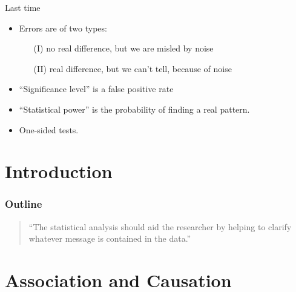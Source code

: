 
\subtitle{and statistical significance}

\date{10 March 2013}




\begin{frame}
  \maketitle
\end{frame}

\begin{frame}{Last time}

    \begin{itemize}
        \item Errors are of two types: 
            \begin{itemize}
                \item[(I)] \alert{no} real difference, but we are misled by noise
                \item[(II)] \alert{real} difference, but we can't tell, because of noise
            \end{itemize}
        \item ``Significance level'' is a false positive rate 
        \item ``Statistical power'' is the probability of finding a real pattern.
        \item One-sided tests.
    \end{itemize}

\end{frame}

\section*{Introduction}
\begin{frame}\frametitle<presentation>{Outline}
  \begin{quote}
    ``The statistical analysis should aid the researcher by helping to clarify whatever
    message is contained in the data.''
  \end{quote}
  \tableofcontents
\end{frame}


\section{Association and Causation}

